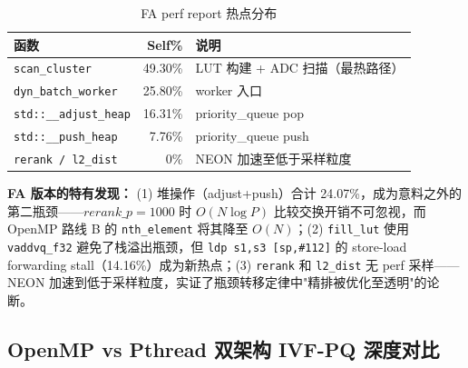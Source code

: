 \documentclass[UTF8,a4paper,10pt]{ctexart}
\begin{document}
\begin{table}[H]
\centering
\caption{FA perf report 热点分布}
\begin{tabular}{lrl}
\hline
函数 & Self\% & 说明 \\
\hline
\texttt{scan\_cluster} & 49.30\% & LUT 构建 + ADC 扫描（最热路径） \\
\texttt{dyn\_batch\_worker} & 25.80\% & worker 入口 \\
\texttt{std::\_\_adjust\_heap} & 16.31\% & priority\_queue pop \\
\texttt{std::\_\_push\_heap} & 7.76\% & priority\_queue push \\
\texttt{rerank / l2\_dist} & 0\% & NEON 加速至低于采样粒度 \\
\hline
\end{tabular}
\end{table}

\textbf{FA 版本的特有发现：} (1) 堆操作（adjust+push）合计 24.07\%，成为意料之外的第二瓶颈——$rerank\_p=1000$ 时 $O(N\log P)$ 比较交换开销不可忽视，而 OpenMP 路线 B 的 \texttt{nth\_element} 将其降至 $O(N)$；(2) \texttt{fill\_lut} 使用 \texttt{vaddvq\_f32} 避免了栈溢出瓶颈，但 \texttt{ldp s1,s3 [sp,\#112]} 的 store-load forwarding stall（14.16\%）成为新热点；(3) \texttt{rerank} 和 \texttt{l2\_dist} 无 perf 采样——NEON 加速到低于采样粒度，实证了瓶颈转移定律中"精排被优化至透明"的论断。

\subsection{OpenMP vs Pthread 双架构 IVF-PQ 深度对比}
\end{document}
